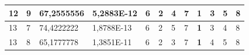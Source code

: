 \documentclass[conference]{IEEEtran}
\begin{document}
\begin{table}[]
\begin{tabular}{|llll|llllllll|}
\multicolumn{1}{|l|}{12}                                                    & \multicolumn{1}{l|}{9}                                                        & \multicolumn{1}{l|}{67,2555556}                                                   & 5,2883E-12                     & \multicolumn{1}{l|}{6}                                                  & \multicolumn{1}{l|}{2}                                                  & \multicolumn{1}{l|}{4}                                                  & \multicolumn{1}{l|}{7}                                                  & \multicolumn{1}{l|}{\textbf{1}}                                         & \multicolumn{1}{l|}{3}                                                  & \multicolumn{1}{l|}{5}                                                  & 8                          \\ \hline
\multicolumn{1}{|l|}{13}                                                    & \multicolumn{1}{l|}{7}                                                        & \multicolumn{1}{l|}{74,4222222}                                                   & 1,8788E-13                     & \multicolumn{1}{l|}{6}                                                  & \multicolumn{1}{l|}{2}                                                  & \multicolumn{1}{l|}{5}                                                  & \multicolumn{1}{l|}{7}                                                  & \multicolumn{1}{l|}{\textbf{1}}                                         & \multicolumn{1}{l|}{3}                                                  & \multicolumn{1}{l|}{4}                                                  & 8                          \\ \hline
\multicolumn{1}{|l|}{13}                                                    & \multicolumn{1}{l|}{8}                                                        & \multicolumn{1}{l|}{65,1777778}                                                   & 1,3851E-11                     & \multicolumn{1}{l|}{6}                                                  & \multicolumn{1}{l|}{2}                                                  & \multicolumn{1}{l|}{3}                                                  & \multicolumn{1}{l|}{7}                                                  & \multicolumn{1}{l|}{\textbf{1}}                                         & \multicolumn{1}{l|}{4}                                                  & \multicolumn{1}{l|}{5}                                                  & 8                          \\ \hline

\end{tabular}
\end{table}
\end{document}
